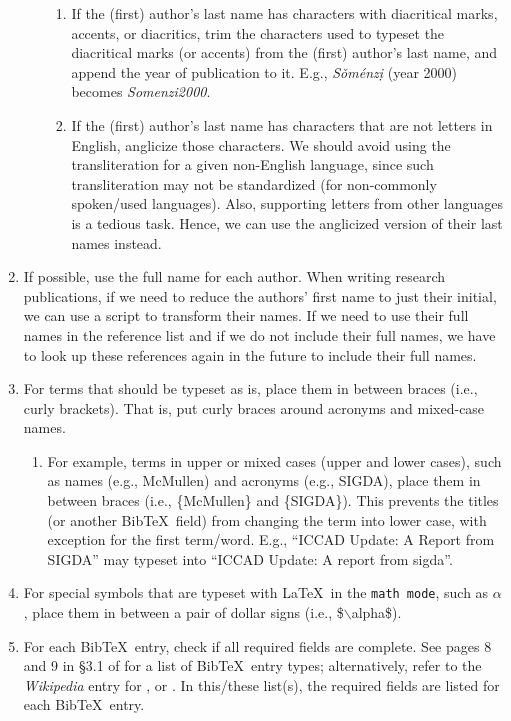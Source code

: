 \documentclass[letter,12pt]{article}
\begin{document}
\begin{enumerate}
\begin{enumerate}
		\begin{enumerate} \itemsep -2pt
		\item If the (first) author's last name has characters with diacritical marks, accents, or diacritics, trim the characters used to typeset the diacritical marks (or accents) from the (first) author's last name, and append the year of publication to it. E.g., {\it S{\v{o}}m{\'{e}}nz{\d{i}}} (year 2000) becomes {\it Somenzi2000}.
		\item If the (first) author's last name has characters that are not letters in English, anglicize those characters. We should avoid using the transliteration for a given non-English language, since such transliteration may not be standardized (for non-commonly spoken/used languages). Also, supporting letters from other languages is a tedious task. Hence, we can use the anglicized version of their last names instead.
		\end{enumerate}
	\end{enumerate}
\item If possible, use the full name for each author. When writing research publications, if we need to reduce the authors' first name to just their initial, we can use a script to transform their names. If we need to use their full names in the reference list and if we do not include their full names, we have to look up these references again in the future to include their full names.
\item For terms that should be typeset as is, place them in between braces (i.e., curly brackets). That is, put curly braces around acronyms and mixed-case names. \vspace{-0.3cm}
	\begin{enumerate} \itemsep -2pt
	\item For example, terms in upper or mixed cases (upper and lower cases), such as names (e.g., McMullen) and acronyms (e.g., SIGDA), place them in between braces (i.e., \{McMullen\} and \{SIGDA\}). This prevents the titles (or another {\sc Bib}\TeX\ field) from changing the term into lower case, with exception for the first term/word. E.g., ``ICCAD Update: A Report from SIGDA'' may typeset into ``ICCAD Update: A report from sigda''.
	\end{enumerate}
\item For special symbols that are typeset with \LaTeX\ in the {\tt math mode}, such as $\alpha$, place them in between a pair of dollar signs (i.e., \$$\backslash$alpha\$).
\item For each {\sc Bib}\TeX\ entry, check if all required fields are complete. See pages 8 and 9 in \S3.1 of \cite{Patashnik1988} for a list of {\sc Bib}\TeX\ entry types; alternatively, refer to the {\it Wikipedia} entry for , or \cite[\S12.2.1, pp. 230--231]{Kopka2004}. In this/these list(s), the required fields are listed for each {\sc Bib}\TeX\ entry.

\end{enumerate}
\end{document}
